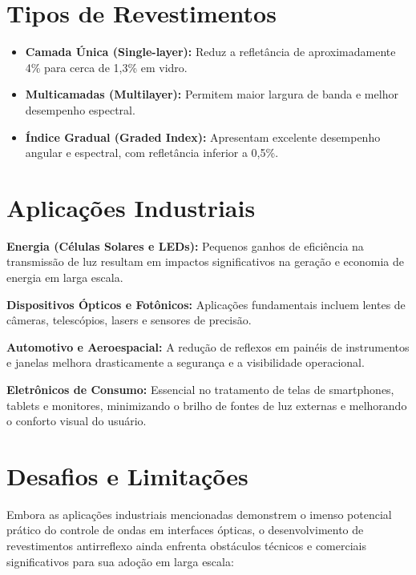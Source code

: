 \documentclass[12pt]{article}
\begin{document}
\section{Tipos de Revestimentos}

\begin{itemize}[itemsep=0.5ex]
    \item \textbf{Camada Única (Single-layer):} Reduz a refletância de aproximadamente 4\% para cerca de 1,3\% em vidro.
    \item \textbf{Multicamadas (Multilayer):} Permitem maior largura de banda e melhor desempenho espectral.
    \item \textbf{Índice Gradual (Graded Index):} Apresentam excelente desempenho angular e espectral, com refletância inferior a 0,5\%.
\end{itemize}

\section{Aplicações Industriais}

\textbf{Energia (Células Solares e LEDs):} Pequenos ganhos de eficiência na transmissão de luz resultam em impactos significativos na geração e economia de energia em larga escala.

\textbf{Dispositivos Ópticos e Fotônicos:} Aplicações fundamentais incluem lentes de câmeras, telescópios, lasers e sensores de precisão.

\textbf{Automotivo e Aeroespacial:} A redução de reflexos em painéis de instrumentos e janelas melhora drasticamente a segurança e a visibilidade operacional.

\textbf{Eletrônicos de Consumo:} Essencial no tratamento de telas de smartphones, tablets e monitores, minimizando o brilho de fontes de luz externas e melhorando o conforto visual do usuário.

\section{Desafios e Limitações}

Embora as aplicações industriais mencionadas demonstrem o imenso potencial prático do controle de ondas em interfaces ópticas, o desenvolvimento de revestimentos antirreflexo ainda enfrenta obstáculos técnicos e comerciais significativos para sua adoção em larga escala:
\end{document}
